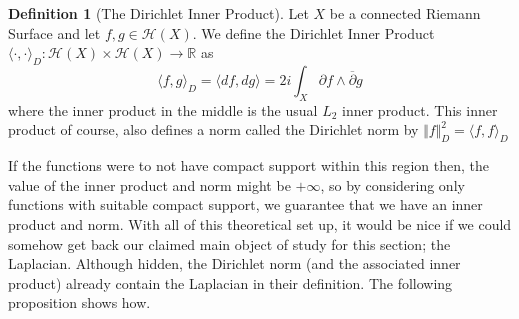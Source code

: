 \documentclass[11pt]{report}
\theoremstyle{definition}
\newtheorem{defn}[thm]{Definition}
\begin{document}
\begin{defn}[The Dirichlet Inner Product]\label{dInnerProduct}
  Let $X$ be a connected Riemann Surface and let $f, g \in \mathcal{H}(X)$.
  We define the Dirichlet Inner Product $\langle \cdot, \cdot \rangle_D : \mathcal{H}(X) \times \mathcal{H}(X) \rightarrow \mathbb{R}$ as 
  \[
    \langle f, g \rangle_D =\langle df, dg \rangle = 2i \int_X \partial f \wedge \overline{\partial} g 
  \]
  where the inner product in the middle is the usual $L_2$ inner product.
  This inner product of course, also defines a norm called the Dirichlet norm by $\Vert f\Vert _D^2 = \langle f, f \rangle_D $
\end{defn}

If the functions were to not have compact support within this region then, the value of the inner product and norm might be $+\infty$, so by considering only functions with suitable compact support, we guarantee that we have an inner product and norm. With all of this theoretical set up, it would be nice if we could somehow get back our claimed main object of study for this section; the Laplacian. Although hidden, the Dirichlet norm (and the associated inner product) already contain the Laplacian in their definition. The following proposition shows how.
\end{document}
